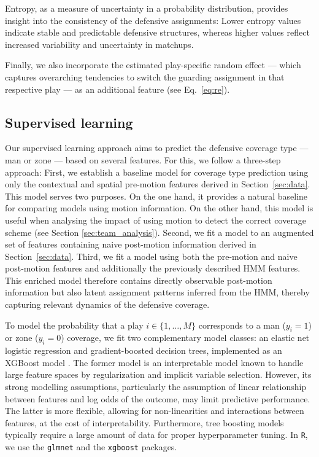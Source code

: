 \documentclass[namedate,webpdf,modern,medium]{oup-authoring-template}
\begin{document}
Entropy, as a measure of uncertainty in a probability distribution, provides insight into the consistency of the defensive assignments: Lower entropy values indicate stable and predictable defensive structures, whereas higher values reflect increased variability and uncertainty in matchups. 

Finally, we also incorporate the estimated play-specific random effect --- which captures overarching tendencies to switch the guarding assignment in that respective play --- as an additional feature (see Eq.~\ref{eq:re}).

\subsection{Supervised learning}
Our supervised learning approach aims to predict the defensive coverage type --- man or zone --- based on several features. %
For this, we follow a three-step approach: First, we establish a baseline model for coverage type prediction using only the contextual and spatial pre-motion features derived in Section~\ref{sec:data}. This model serves two purposes. On the one hand, it provides a natural baseline for comparing models using motion information. On the other hand, this model is useful when analysing the impact of using motion to detect the correct coverage scheme (see Section \ref{sec:team_analysis}). Second, we fit a model to an augmented set of features containing naive post-motion information derived in Section~\ref{sec:data}. Third, we fit a model using both the pre-motion and naive post-motion features and additionally the previously described HMM features. This enriched model therefore contains directly observable post-motion information but also latent assignment patterns inferred from the HMM, thereby capturing relevant dynamics of the defensive coverage.

To model the probability that a play \( i \in \{1, \dots, M\} \) corresponds to a man (\( y_i = 1 \)) or zone (\( y_i = 0 \)) coverage, we fit two complementary model classes: an elastic net logistic regression \citep{Zou05elastic} and gradient-boosted decision trees, implemented as an XGBoost model \citep{chen2016xgboost}. The former model is an interpretable model known to handle large feature spaces by regularization and implicit variable selection. However, its strong modelling assumptions, particularly the assumption of linear relationship between features and log odds of the outcome, may limit predictive performance. The latter is more flexible, allowing for non-linearities and interactions between features, at the cost of interpretability. Furthermore, tree boosting models typically require a large amount of data for proper hyperparameter tuning. In \texttt{R}, we use the \texttt{glmnet} \citep{friedman2021package} and the \texttt{xgboost} \citep{chen2019package} packages.
\end{document}

